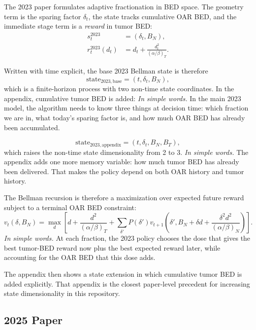 \documentclass[11pt]{article}
\newcommand{\BN}{B_N}
\newcommand{\BT}{B_T}
\begin{document}
The 2023 paper formulates adaptive fractionation in BED space. The geometry term is the sparing factor $\delta_t$, the state tracks cumulative OAR BED, and the immediate stage term is a \emph{reward} in tumor BED:
\begin{align}
s_t^{2023} &= (\delta_t, \BN), \\
r_t^{2023}(d_t) &= d_t + \frac{d_t^2}{(\alpha/\beta)_T}.
\end{align}

Written with time explicit, the base 2023 Bellman state is therefore
\begin{equation}
\text{state}_{2023,\mathrm{base}} = (t,\delta_t,\BN),
\end{equation}
which is a finite-horizon process with two non-time state coordinates. In the appendix, cumulative tumor BED is added:
\noindent\textit{In simple words.} In the main 2023 model, the algorithm needs to know three things at decision time: which fraction we are in, what today's sparing factor is, and how much OAR BED has already been accumulated.

\begin{equation}
\text{state}_{2023,\mathrm{appendix}} = (t,\delta_t,\BN,\BT),
\end{equation}
which raises the non-time state dimensionality from 2 to 3.
\noindent\textit{In simple words.} The appendix adds one more memory variable: how much tumor BED has already been delivered. That makes the policy depend on both OAR history and tumor history.

The Bellman recursion is therefore a maximization over expected future reward subject to a terminal OAR BED constraint:
\begin{equation}
v_t(\delta,\BN) =
\max_d \left[
d + \frac{d^2}{(\alpha/\beta)_T}
+ \sum_{\delta'} P(\delta') v_{t+1}\!\left(\delta', \BN + \delta d + \frac{\delta^2 d^2}{(\alpha/\beta)_N}\right)
\right].
\end{equation}
\noindent\textit{In simple words.} At each fraction, the 2023 policy chooses the dose that gives the best tumor-BED reward now plus the best expected reward later, while accounting for the OAR BED that this dose adds.

The appendix then shows a state extension in which cumulative tumor BED is added explicitly. That appendix is the closest paper-level precedent for increasing state dimensionality in this repository.

\subsection{2025 Paper}
\end{document}
